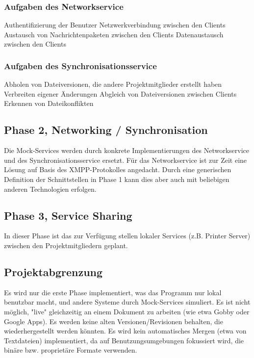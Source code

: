 \subsubsection{Aufgaben des Networkservice}
Authentifizierung der Benutzer
Netzwerkverbindung zwischen den Clients
Austausch von Nachrichtenpaketen zwischen den Clients
Datenaustausch zwischen den Clients

\subsubsection{Aufgaben des Synchronisationsservice}
Abholen von Dateiversionen, die andere Projektmitglieder erstellt haben
Verbreiten eigener Änderungen
Abgleich von Dateiversionen zwischen Clients
Erkennen von Dateikonflikten
\subsection{Phase 2, Networking / Synchronisation}
Die Mock-Services werden durch konkrete Implementierungen des Networkservice und des Synchronisationsservice ersetzt. Für das Networkservice ist zur Zeit eine Lösung auf Basis des XMPP-Protokolles angedacht. Durch eine generischen Definition der Schnittstellen in Phase 1 kann dies aber auch mit beliebigen anderen Technologien erfolgen.
\subsection{Phase 3, Service Sharing}
In dieser Phase ist das zur Verfügung stellen lokaler Services (z.B. Printer Server) zwischen den Projektmitgliedern geplant.

\subsection{Projektabgrenzung}
Es wird nur die erste Phase implementiert, was das Programm nur lokal benutzbar macht, und andere Systeme durch Mock-Services simuliert. 
Es ist nicht möglich, "live" gleichzeitig an einem Dokument zu arbeiten (wie etwa Gobby oder Google Apps).
Es werden keine alten Versionen/Revisionen behalten, die wiederhergestellt werden könnten.
Es wird kein automatisches Mergen (etwa von Textdateien) implementiert, da auf Benutzungsumgebungen fokussiert wird, die binäre bzw. proprietäre Formate verwenden.






